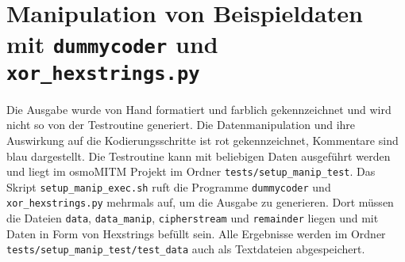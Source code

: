 \section{Manipulation von Beispieldaten mit \texttt{dummycoder} und \texttt{xor\_hexstrings.py}}\label{hdl:a_example_setup_manip}

Die Ausgabe wurde von Hand formatiert und farblich gekennzeichnet und wird nicht so von der Testroutine generiert. Die Datenmanipulation und ihre Auswirkung auf die Kodierungsschritte ist rot gekennzeichnet, Kommentare sind blau dargestellt. Die Testroutine kann mit beliebigen Daten ausgeführt werden und liegt im osmoMITM Projekt im Ordner \texttt{tests/setup\_manip\_test}. Das Skript \texttt{setup\_manip\_exec.sh} ruft die Programme \texttt{dummycoder} und \texttt{xor\_hexstrings.py} mehrmals auf, um die Ausgabe zu generieren. Dort müssen die Dateien \texttt{data}, \texttt{data\_manip}, \texttt{cipherstream} und \texttt{remainder} liegen und mit Daten in Form von Hexstrings befüllt sein. Alle Ergebnisse werden im Ordner \texttt{tests/setup\_manip\_test/test\_data} auch als Textdateien abgespeichert.\\

